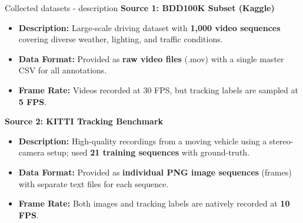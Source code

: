 \documentclass{beamer}
\begin{document}
\begin{frame}{Collected datasets - description}
    \textbf{Source 1: BDD100K Subset (Kaggle)}
    \begin{itemize}
        \item \textbf{Description:} Large-scale driving dataset with \textbf{1,000 video sequences} covering diverse weather, lighting, and traffic conditions.
        \item \textbf{Data Format:} Provided as \textbf{raw video files} (.mov) with a single master CSV for all annotations.
        \item \textbf{Frame Rate:} Videos recorded at 30 FPS, but tracking labels are sampled at \textbf{5 FPS}.
    \end{itemize}
    
    \vspace{0.4cm}
    
    \textbf{Source 2: KITTI Tracking Benchmark}
    \begin{itemize}
        \item \textbf{Description:} High-quality recordings from a moving vehicle using a stereo-camera setup; used \textbf{21 training sequences} with ground-truth.
        \item \textbf{Data Format:} Provided as \textbf{individual PNG image sequences} (frames) with separate text files for each sequence.
        \item \textbf{Frame Rate:} Both images and tracking labels are natively recorded at \textbf{10 FPS}.
    \end{itemize}
\end{frame}
\end{document}
